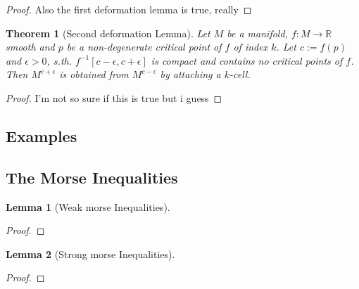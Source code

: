 \documentclass{article}
\theoremstyle{plain}
\newtheorem{theorem}{Theorem}[subsection]
\theoremstyle{plain}
\theoremstyle{plain}
\newtheorem{lemma}{Lemma}[subsection]
\theoremstyle{definition}
\theoremstyle{remark}
\begin{document}
\begin{proof}
   Also the first deformation lemma is true, really
\end{proof}

\begin{theorem}[Second deformation Lemma]
   \label{theorem:2nd deformation lemma}
   Let $M$ be a manifold, $f: M \rightarrow \mathbb{R}$ smooth and $p$ be a non-degenerate critical point
   of $f$ of index $k$. Let $c := f(p)$ and $\epsilon > 0$, s.th. $f^{-1}[c-\epsilon, c+\epsilon]$
   is compact and contains no critical points of $f$. Then $M^{c+\epsilon}$ is obtained from $M^{c-\epsilon}$
   by attaching a $k$-cell.
\end{theorem}

\begin{proof}
   I'm not so sure if this is true but i guess
\end{proof}

\subsection{Examples}

\subsection{The Morse Inequalities}

\begin{lemma}[Weak morse Inequalities]
   \label{lemma:weak morse inequalities}

\end{lemma}

\begin{proof}


\end{proof}

\begin{lemma}[Strong morse Inequalities]
   \label{lemma:strung morse inequalities}

\end{lemma}

\begin{proof}

\end{proof}
\end{document}
